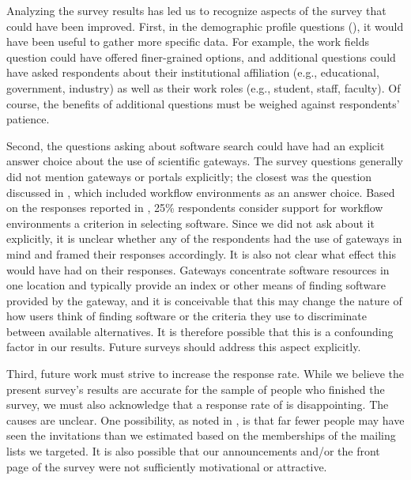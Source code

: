 \documentclass{casicswhitepaper}
\begin{document}


Analyzing the survey results has led us to recognize aspects of the survey that could have been improved.  First, in the demographic profile questions (), it would have been useful to gather more specific data.  For example, the work fields question could have offered finer-grained options, and additional questions could have asked respondents about their institutional affiliation (e.g., educational, government, industry) as well as their work roles (e.g., student, staff, faculty).  Of course, the benefits of additional questions must be weighed against respondents' patience.

Second, the questions asking about software search could have had an explicit answer choice about the use of scientific gateways.  The survey questions generally did not mention gateways or portals explicitly; the closest was the question discussed in , which included workflow environments as an answer choice.  Based on the responses reported in , 25\% respondents consider support for workflow environments a criterion in selecting software.  Since we did not ask about it explicitly, it is unclear whether any of the respondents had the use of gateways in mind and framed their responses accordingly.  It is also not clear what effect this would have had on their responses.  Gateways concentrate software resources in one location and typically provide an index or other means of finding software provided by the gateway, and it is conceivable that this may change the nature of how users think of finding software or the criteria they use to discriminate between available alternatives.  It is therefore possible that this is a confounding factor in our results.  Future surveys should address this aspect explicitly.

Third, future work must strive to increase the response rate.  While we believe the present survey's results are accurate for the sample of people who finished the survey, we must also acknowledge that a response rate of \populationResponseRate is disappointing.  The causes are unclear.  One possibility, as noted in , is that far fewer people may have seen the invitations than we estimated based on the memberships of the mailing lists we targeted.  It is also possible that our announcements and/or the front page of the survey were not sufficiently motivational or attractive.
\end{document}
